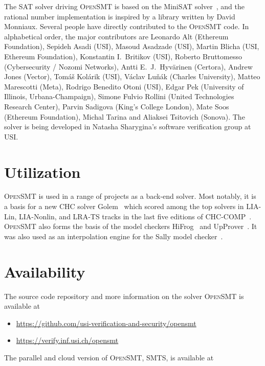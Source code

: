 \documentclass{easychair}
\newcommand{\opensmt}{\textsc{OpenSMT}\xspace}
\begin{document}
The SAT solver driving \opensmt is based on the MiniSAT
solver~\cite{EenS:SAT03}, and the rational number implementation is
inspired by a library written by David Monniaux.  Several people have
directly contributed to the \opensmt code.  In alphabetical order, the
major contributors are
%
Leonardo Alt (Ethereum Foundation),
Sepideh Asadi (USI),
Masoud Asadzade (USI),
Martin Blicha (USI, Ethereum Foundation),
Konstantin I.~Britikov (USI),
Roberto Bruttomesso (Cybersecurity / Nozomi Networks),
Antti E.~J.~Hyv{\"a}rinen (Certora),
Andrew Jones (Vector),
Tomáš Kolárik (USI),
Václav Luňák (Charles University),
Matteo Marescotti (Meta),
Rodrigo Benedito Otoni (USI),
Edgar Pek (University of Illinois, Urbana-Champaign),
Simone Fulvio Rollini (United Technologies Research Center),
Parvin Sadigova (King's College London),
Mate Soos (Ethereum Foundation),
Michal Tarina
and Aliaksei Tsitovich (Sonova).
%
The solver is being developed in Natasha Sharygina's software
verification group at USI.

\section{Utilization}

\opensmt is used in a range of projects as a back-end solver.
Most notably, it is a basis for a new CHC solver Golem~\cite{BlichaBS:CAV23} which scored among the top solvers
in LIA-Lin, LIA-Nonlin, and LRA-TS tracks in the last five editions of CHC-COMP~\cite{Rummer_2020,Rummer_2021,De_Angelis_2022,CHC-COMP23,CHC-COMP24}.
\opensmt also forms the basis of the model checkers HiFrog~\cite{AltACMFHS17} and
UpProver~\cite{Asadi_2020b}.
It was also used as an interpolation engine for the Sally model
checker~\cite{JovanovicD:FMCAD16}.

\section{Availability}
The source code repository and more information on the solver \opensmt is
available at

\begin{itemize}
    \item \url{https://github.com/usi-verification-and-security/opensmt}
    \item \url{https://verify.inf.usi.ch/opensmt}
\end{itemize}

The parallel and cloud version of \opensmt, SMTS, is available at
\end{document}
